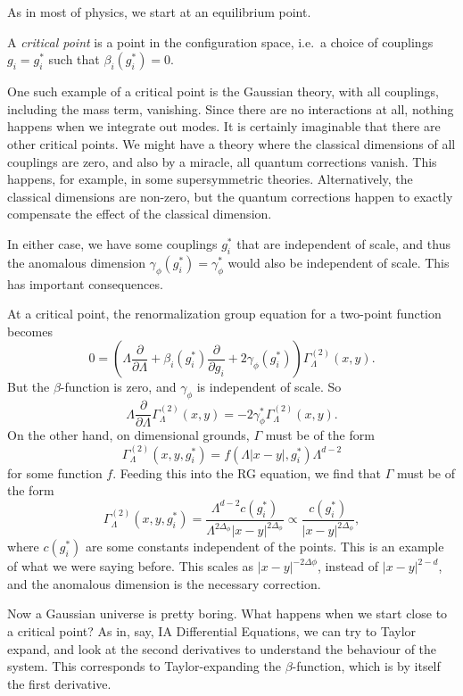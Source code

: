 \documentclass[a4paper]{article}
\begin{document}
As in most of physics, we start at an equilibrium point.
\begin{defi}
  A \emph{critical point} is a point in the configuration space, i.e.\ a choice of couplings $g_i = g_i^*$ such that $\beta_i(g_i^*) = 0$.
\end{defi}
One such example of a critical point is the Gaussian theory, with all couplings, including the mass term, vanishing. Since there are no interactions at all, nothing happens when we integrate out modes. It is certainly imaginable that there are other critical points. We might have a theory where the classical dimensions of all couplings are zero, and also by a miracle, all quantum corrections vanish. This happens, for example, in some supersymmetric theories. Alternatively, the classical dimensions are non-zero, but the quantum corrections happen to exactly compensate the effect of the classical dimension.

In either case, we have some couplings $g_i^*$ that are independent of scale, and thus the anomalous dimension $\gamma_\phi(g_i^*) = \gamma_\phi^*$ would also be independent of scale. This has important consequences.
\begin{eg}
  At a critical point, the renormalization group equation for a two-point function becomes
  \[
    0 = \left(\Lambda \frac{\partial}{\partial \Lambda} + \beta_i(g_i^*) \frac{\partial}{\partial g_i} + 2 \gamma_\phi (g_i^*)\right) \Gamma_\Lambda^{(2)} (x, y).
  \]
  But the $\beta$-function is zero, and $\gamma_\phi$ is independent of scale. So
  \[
    \Lambda \frac{\partial}{\partial \Lambda} \Gamma^{(2)}_\Lambda(x, y) = -2 \gamma_\phi^* \Gamma_\Lambda^{(2)}(x, y).
  \]
  On the other hand, on dimensional grounds, $\Gamma$ must be of the form
  \[
    \Gamma_\Lambda^{(2)} (x, y, g_i^*) = f(\Lambda|x - y|, g_i^*) \Lambda^{d - 2}
  \]
  for some function $f$. Feeding this into the RG equation, we find that $\Gamma$ must be of the form
  \[
    \Gamma_\Lambda^{(2)} (x, y, g_i^*) = \frac{\Lambda^{d - 2} c(g_i^*)}{ \Lambda^{2 \Delta_\phi} |x - y|^{2 \Delta_\phi}} \propto \frac{c(g_i^*)}{|x - y|^{2 \Delta_\phi}},
  \]
  where $c(g_i^*)$ are some constants independent of the points. This is an example of what we were saying before. This scales as $|x - y|^{-2 \Delta \phi}$, instead of $|x - y|^{2 - d}$, and the anomalous dimension is the necessary correction.
\end{eg}

Now a Gaussian universe is pretty boring. What happens when we start close to a critical point? As in, say, IA Differential Equations, we can try to Taylor expand, and look at the second derivatives to understand the behaviour of the system. This corresponds to Taylor-expanding the $\beta$-function, which is by itself the first derivative.
\end{document}
